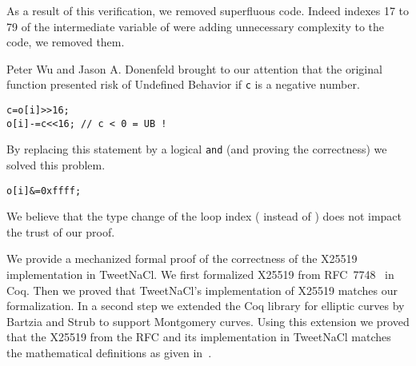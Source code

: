 As a result of this verification, we removed superfluous code.
Indeed indexes 17 to 79 of the  intermediate variable of
 were adding unnecessary complexity to the code,
we removed them.

Peter Wu and Jason A. Donenfeld brought to our attention that the original
 function presented risk of Undefined Behavior if \texttt{c}
is a negative number.
\begin{lstlisting}[language=Ctweetnacl]
c=o[i]>>16;
o[i]-=c<<16; // c < 0 = UB !
\end{lstlisting}
By replacing this statement by a logical \texttt{and} (and proving the correctness)
we solved this problem.
\begin{lstlisting}[language=Ctweetnacl]
o[i]&=0xffff;
\end{lstlisting}

We believe that the type change of the loop index ( instead of )
does not impact the trust of our proof.


We provide a mechanized formal proof of the correctness of the X25519
implementation in TweetNaCl.
We first formalized X25519 from RFC~7748~\cite{rfc7748} in Coq. Then we proved
that TweetNaCl's implementation of X25519 matches our formalization.
In a second step we extended the Coq library for elliptic curves \cite{BartziaS14}
by Bartzia and Strub to support Montgomery curves. Using this extension we
proved that the X25519 from the RFC and its implementation in TweetNaCl matches
the mathematical definitions as given in~\cite[Sec.~2]{Ber06}.
